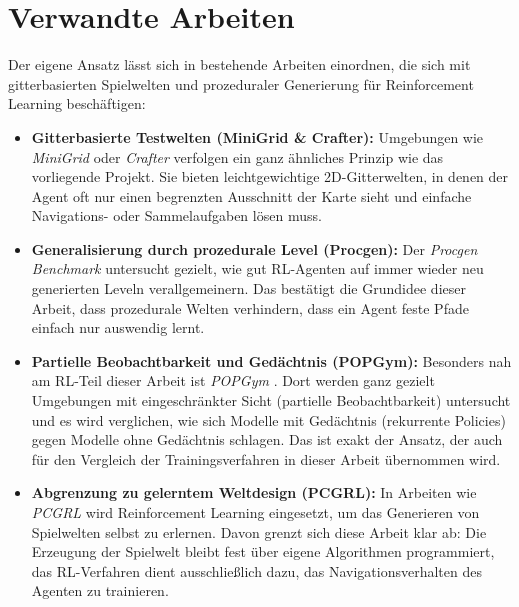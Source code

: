 \documentclass[
  a4paper,
  11pt,
  twoside,
  BCOR=8mm,           %
  headings=big,
  numbers=noenddot,
  listof=totoc,       %
  captions=tableheading,
]{scrreprt}
\begin{document}
\section{Verwandte Arbeiten}
\label{sec:verwandte_arbeiten}

Der eigene Ansatz lässt sich in bestehende Arbeiten einordnen, die sich mit gitterbasierten Spielwelten und prozeduraler Generierung für Reinforcement Learning beschäftigen:

\begin{itemize}
    \item \textbf{Gitterbasierte Testwelten (MiniGrid \& Crafter):} Umgebungen wie \textit{MiniGrid} \cite{chevalier2023minigrid} oder \textit{Crafter} \cite{hafner2021crafter} verfolgen ein ganz ähnliches Prinzip wie das vorliegende Projekt. Sie bieten leichtgewichtige 2D-Gitterwelten, in denen der Agent oft nur einen begrenzten Ausschnitt der Karte sieht und einfache Navigations- oder Sammelaufgaben lösen muss.
    \item \textbf{Generalisierung durch prozedurale Level (Procgen):} Der \textit{Procgen Benchmark} \cite{cobbe2020procgen} untersucht gezielt, wie gut RL-Agenten auf immer wieder neu generierten Leveln verallgemeinern. Das bestätigt die Grundidee dieser Arbeit, dass prozedurale Welten verhindern, dass ein Agent feste Pfade einfach nur auswendig lernt.
    \item \textbf{Partielle Beobachtbarkeit und Gedächtnis (POPGym):} Besonders nah am RL-Teil dieser Arbeit ist \textit{POPGym} \cite{morad2023popgym}. Dort werden ganz gezielt Umgebungen mit eingeschränkter Sicht (partielle Beobachtbarkeit) untersucht und es wird verglichen, wie sich Modelle mit Gedächtnis (rekurrente Policies) gegen Modelle ohne Gedächtnis schlagen. Das ist exakt der Ansatz, der auch für den Vergleich der Trainingsverfahren in dieser Arbeit übernommen wird.
    \item \textbf{Abgrenzung zu gelerntem Weltdesign (PCGRL):} In Arbeiten wie \textit{PCGRL} \cite{khalifa2020pcgrl} wird Reinforcement Learning eingesetzt, um das Generieren von Spielwelten selbst zu erlernen. Davon grenzt sich diese Arbeit klar ab: Die Erzeugung der Spielwelt bleibt fest über eigene Algorithmen programmiert, das RL-Verfahren dient ausschließlich dazu, das Navigationsverhalten des Agenten zu trainieren.
\end{itemize}


\end{document}
